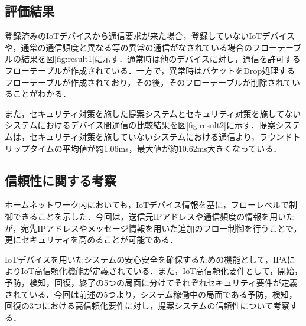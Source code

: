 \documentclass[Japanese]{dicomopapers}
\begin{document}
\subsection{評価結果}
登録済みのIoTデバイスから通信要求が来た場合，登録していないIoTデバイスや，通常の通信頻度と異なる等の異常の通信がなされている場合のフローテーブルの結果を図\ref{fig:result1}に示す．通常時は他のデバイスに対し，通信を許可するフローテーブルが作成されている．一方で，異常時はパケットをDrop処理するフローテーブルが作成されており，その後，そのフローテーブルが削除されていることがわかる．\par
また，セキュリティ対策を施した提案システムとセキュリティ対策を施してないシステムにおけるデバイス間通信の比較結果を図\ref{fig:result2}に示す．提案システムは，セキュリティ対策を施していないシステムにおける通信より，ラウンドトリップタイムの平均値が約1.06ms，最大値が約10.62ms大きくなっている．

\subsection{信頼性に関する考察}
ホームネットワーク内においても，IoTデバイス情報を基に，フローレベルで制御できることを示した．今回は，送信元IPアドレスや通信頻度の情報を用いたが，宛先IPアドレスやメッセージ情報を用いた追加のフロー制御を行うことで，更にセキュリティを高めることが可能である．\par
IoTデバイスを用いたシステムの安心安全を確保するための機能として，IPAによりIoT高信頼化機能が定義されている．また，IoT高信頼化要件として，開始，予防，検知，回復，終了の5つの局面に分けてそれぞれセキュリティ要件が定義されている\cite{IPA}．今回は前述の5つより，システム稼働中の局面である予防，検知，回復の3つにおける高信頼化要件に対し，提案システムの信頼性について考察する．
\end{document}
